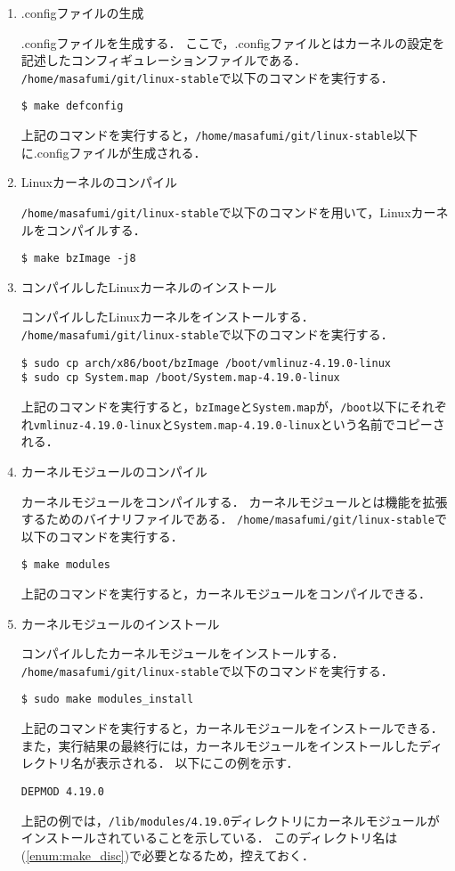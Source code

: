 \documentclass[12pt]{jsarticle}
\begin{document}
\begin{enumerate}
\item .configファイルの生成

  .configファイルを生成する．
  ここで，.configファイルとはカーネルの設定を記述したコンフィギュレーションファイルである．
  \verb|/home/masafumi/git/linux-stable|で以下のコマンドを実行する．
\begin{verbatim}
$ make defconfig
\end{verbatim}
上記のコマンドを実行すると，\verb|/home/masafumi/git/linux-stable|以下に.configファイルが生成される．

\item\label{enum:compile} Linuxカーネルのコンパイル

  \verb|/home/masafumi/git/linux-stable|で以下のコマンドを用いて，Linuxカーネルをコンパイルする．
\begin{verbatim}
$ make bzImage -j8
\end{verbatim}

\item コンパイルしたLinuxカーネルのインストール
  
  コンパイルしたLinuxカーネルをインストールする．
  \verb|/home/masafumi/git/linux-stable|で以下のコマンドを実行する．
\begin{verbatim}
$ sudo cp arch/x86/boot/bzImage /boot/vmlinuz-4.19.0-linux
$ sudo cp System.map /boot/System.map-4.19.0-linux
\end{verbatim}
上記のコマンドを実行すると，\verb|bzImage|と\verb|System.map|が，\verb|/boot|以下にそれぞれ\verb|vmlinuz-4.19.0-linux|と\verb|System.map-4.19.0-linux|という名前でコピーされる．

\item\label{enum:module:module_compile} カーネルモジュールのコンパイル

  カーネルモジュールをコンパイルする．
  カーネルモジュールとは機能を拡張するためのバイナリファイルである．
  \verb|/home/masafumi/git/linux-stable|で以下のコマンドを実行する．
\begin{verbatim}
$ make modules
\end{verbatim}
上記のコマンドを実行すると，カーネルモジュールをコンパイルできる．

\item\label{enum:module_install} カーネルモジュールのインストール

  コンパイルしたカーネルモジュールをインストールする．\\
  \verb|/home/masafumi/git/linux-stable|で以下のコマンドを実行する．
\begin{verbatim}
$ sudo make modules_install
\end{verbatim}
上記のコマンドを実行すると，カーネルモジュールをインストールできる．
また，実行結果の最終行には，カーネルモジュールをインストールしたディレクトリ名が表示される．
以下にこの例を示す．
\begin{verbatim}
DEPMOD 4.19.0
\end{verbatim}
上記の例では，\verb|/lib/modules/4.19.0|ディレクトリにカーネルモジュールがインストールされていることを示している．
このディレクトリ名は(\ref{enum:make_disc})で必要となるため，控えておく．


\end{enumerate}
\end{document}

